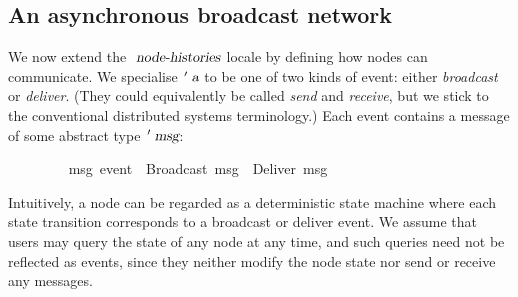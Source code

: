 \subsection{An asynchronous broadcast network}

We now extend the $\isa{node-histories}$ locale by defining how nodes can communicate.
We specialise $\isacharprime\isa{a}$ to be one of two kinds of event: either \emph{broadcast} or \emph{deliver}.
(They could equivalently be called \emph{send} and \emph{receive}, but we stick to the conventional distributed systems terminology.)
Each event contains a message of some abstract type $\isacharprime\isa{msg}$:
\vspace{0.35em}
\begin{isabellebody}
\ \ \ \ \ \ \ \  {\isacharprime}msg\ event\ {\isacharequal}\ Broadcast\ {\isacharprime}msg\ {\isacharbar}\ Deliver\ {\isacharprime}msg
\end{isabellebody}
\vspace{0.35em}
Intuitively, a node can be regarded as a deterministic state machine where each state transition corresponds to a broadcast or deliver event.
We assume that users may query the state of any node at any time, and such queries need not be reflected as events, since they neither modify the node state nor send or receive any messages.

